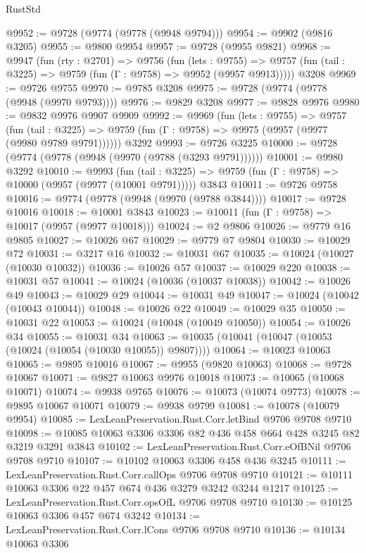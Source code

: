 \begin{lexlean}{RustStd}
\begin{coremodule}
@9952 := @9728 (@9774 (@9778 (@9948 @9794)))
@9954 := @9902 (@9816 @3205)
@9955 := @9800 @9954
@9957 := @9728 (@9955 @9821)
@9968 := @9947
    (fun (rty : @2701) =>
    @9756
      (fun (lets : @9755) =>
      @9757 (fun (tail : @3225) => @9759 (fun (Γ : @9758) => @9952 (@9957 @9913)))))
    @3208
@9969 := @9726 @9755
@9970 := @9785 @3208
@9975 := @9728 (@9774 (@9778 (@9948 (@9970 @9793))))
@9976 := @9829 @3208
@9977 := @9828 @9976
@9980 := @9832 @9976 @9907 @9909
@9992 := @9969
    (fun (lets : @9755) =>
    @9757
      (fun (tail : @3225) => @9759 (fun (Γ : @9758) => @9975 (@9957 (@9977 (@9980 @9789 @9791))))))
    @3292
@9993 := @9726 @3225
@10000 := @9728 (@9774 (@9778 (@9948 (@9970 (@9788 (@3293 @9791))))))
@10001 := @9980 @3292
@10010 := @9993
    (fun (tail : @3225) => @9759 (fun (Γ : @9758) => @10000 (@9957 (@9977 (@10001 @9791)))))
    @3843
@10011 := @9726 @9758
@10016 := @9774 (@9778 (@9948 (@9970 (@9788 @3844))))
@10017 := @9728 @10016
@10018 := @10001 @3843
@10023 := @10011 (fun (Γ : @9758) => @10017 (@9957 (@9977 @10018)))
@10024 := @2 @9806
@10026 := @9779 @16 @9805
@10027 := @10026 @67
@10029 := @9779 @7 @9804
@10030 := @10029 @72
@10031 := @3217 @16
@10032 := @10031 @67
@10035 := @10024 (@10027 (@10030 @10032))
@10036 := @10026 @57
@10037 := @10029 @220
@10038 := @10031 @57
@10041 := @10024 (@10036 (@10037 @10038))
@10042 := @10026 @49
@10043 := @10029 @29
@10044 := @10031 @49
@10047 := @10024 (@10042 (@10043 @10044))
@10048 := @10026 @22
@10049 := @10029 @35
@10050 := @10031 @22
@10053 := @10024 (@10048 (@10049 @10050))
@10054 := @10026 @34
@10055 := @10031 @34
@10063 := @10035 (@10041 (@10047 (@10053 (@10024 (@10054 (@10030 @10055)) @9807))))
@10064 := @10023 @10063
@10065 := @9895 @10016
@10067 := @9955 (@9820 @10063)
@10068 := @9728 @10067
@10071 := @9827 @10063 @9976 @10018
@10073 := @10065 (@10068 @10071)
@10074 := @9938 @9765
@10076 := @10073 (@10074 @9773)
@10078 := @9895 @10067 @10071
@10079 := @9938 @9799
@10081 := @10078 (@10079 @9954)
@10085 := LexLeanPreservation.Rust.Corr.letBind @9706 @9708 @9710
@10098 := @10085 @10063 @3306 @3306 @82 @436 @458 @664 @428 @3245 @82 @3219 @3291 @3843
@10102 := LexLeanPreservation.Rust.Corr.eOfBNil @9706 @9708 @9710
@10107 := @10102 @10063 @3306 @458 @436 @3245
@10111 := LexLeanPreservation.Rust.Corr.callOps @9706 @9708 @9710
@10121 := @10111 @10063 @3306 @22 @457 @674 @436 @3279 @3242 @3244 @1217
@10125 := LexLeanPreservation.Rust.Corr.opsOfL @9706 @9708 @9710
@10130 := @10125 @10063 @3306 @457 @674 @3242
@10134 := LexLeanPreservation.Rust.Corr.lCons @9706 @9708 @9710
@10136 := @10134 @10063 @3306

\end{coremodule}
\end{lexlean}
